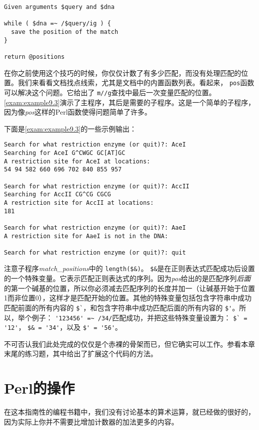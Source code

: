 \begin{lstlisting}
Given arguments $query and $dna

while ( $dna =~ /$query/ig ) {
  save the position of the match
}

return @positions
\end{lstlisting}

在你之前使用这个技巧的时候，你仅仅计数了有多少匹配，而没有处理匹配的位置。我们来看看文档找点线索，尤其是文档中的内置函数列表。看起来， \verb|pos|函数可以解决这个问题。它给出了 \verb|m//g|查找中最后一次变量匹配的位置。\autoref{exam:example9.3}演示了主程序，其后是需要的子程序。这是一个简单的子程序，因为像\textit{pos}这样的Perl函数使得问题简单了许多。



下面是\autoref{exam:example9.3}的一些示例输出：

\begin{lstlisting}
Search for what restriction enzyme (or quit)?: AceI
Searching for AceI G^CWGC GC[AT]GC
A restriction site for AceI at locations:
54 94 582 660 696 702 840 855 957

Search for what restriction enzyme (or quit)?: AccII
Searching for AccII CG^CG CGCG
A restriction site for AccII at locations:
181

Search for what restriction enzyme (or quit)?: AaeI
A restriction site for AaeI is not in the DNA:

Search for what restriction enzyme (or quit)?: quit
\end{lstlisting}

注意子程序\textit{match\_positions}中的 \verb|length($&)|。 \verb|$&|是在正则表达式匹配成功后设置的一个特殊变量。它表示匹配正则表达式的序列。因为\textit{pos}给出的是匹配序列\textit{后面}的第一个碱基的位置，所以你必须减去匹配序列的长度并加一（让碱基开始于位置1而非位置0），这样才是匹配开始的位置。其他的特殊变量包括包含字符串中成功匹配前面的所有内容的 \verb|$`|，和包含字符串中成功匹配后面的所有内容的 \verb|$'|。所以，举个例子： \verb|'123456' =~ /34/|匹配成功，并把这些特殊变量设置为： \verb|$` = '12'|， \verb|$& = '34'|，以及 \verb|$' = '56'|。

不可否认我们此处完成的仅仅是个赤裸的骨架而已，但它确实可以工作。参看本章末尾的练习题，其中给出了扩展这个代码的方法。

\section{Perl的操作}
在这本指南性的编程书籍中，我们没有讨论基本的算术运算，就已经做的很好的，因为实际上你并不需要比增加计数器的加法更多的内容。

